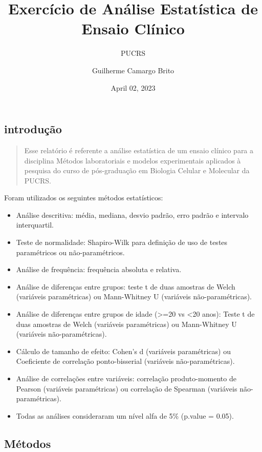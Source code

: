 \documentclass[
]{article}
\title{Exercício de Análise Estatística de Ensaio Clínico}
\subtitle{PUCRS}
\author{Guilherme Camargo Brito}
\date{April 02, 2023}
\providecommand{\tightlist}{%
  \setlength{\itemsep}{0pt}\setlength{\parskip}{0pt}}
\begin{document}
\maketitle

{
\setcounter{tocdepth}{2}
\tableofcontents
}
\hypertarget{introduuxe7uxe3o}{%
\subsection{introdução}\label{introduuxe7uxe3o}}

\begin{quote}
Esse relatório é referente a análise estatística de um ensaio clínico
para a disciplina Métodos laboratoriais e modelos experimentais
aplicados à pesquisa do curso de pós-graduação em Biologia Celular e
Molecular da PUCRS.
\end{quote}

Foram utilizados os seguintes métodos estatísticos:

\begin{itemize}
\tightlist
\item
  Análise descritiva: média, mediana, desvio padrão, erro padrão e
  intervalo interquartil.
\item
  Teste de normalidade: Shapiro-Wilk para definição de uso de testes
  paramétricos ou não-paramétricos.
\item
  Análise de frequência: frequência absoluta e relativa.
\item
  Análise de diferenças entre grupos: teste t de duas amostras de Welch
  (variáveis paramétricas) ou Mann-Whitney U (variáveis
  não-paramétricas).
\item
  Análise de diferenças entre grupos de idade (\textgreater=20 vs
  \textless20 anos): Teste t de duas amostras de Welch (variáveis
  paramétricas) ou Mann-Whitney U (variáveis não-paramétricas).
\item
  Cálculo de tamanho de efeito: Cohen's d (variáveis paramétricas) ou
  Coeficiente de correlação ponto-bisserial (variáveis
  não-paramétricas).
\item
  Análise de correlações entre variáveis: correlação produto-momento de
  Pearson (variáveis paramétricas) ou correlação de Spearman (variáveis
  não-paramétricas).
\item
  Todas as análises consideraram um nível alfa de 5\% (p.value = 0.05).
\end{itemize}

\hypertarget{muxe9todos}{%
\subsection{Métodos}\label{muxe9todos}}
\end{document}

